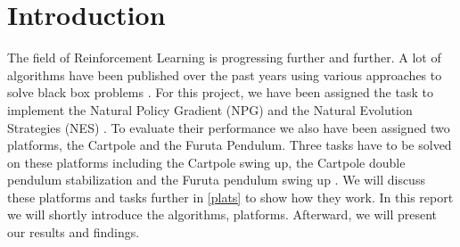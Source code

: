 \section{Introduction}
\label{intro}
The field of Reinforcement Learning is progressing further and further. A lot of algorithms have been published over the past years using various approaches to solve black box problems \cite{Wierstra14}. For this project, we have been assigned the task to implement the Natural Policy Gradient (NPG) \cite{Rajeswaran2017,Kakade2001} and the Natural Evolution Strategies (NES) \cite{Wierstra14}. To evaluate their performance we also have been assigned two platforms, the Cartpole and the Furuta Pendulum. Three tasks have to be solved on these platforms including the Cartpole swing up, the Cartpole double pendulum stabilization and the Furuta pendulum swing up \cite{Furuta1991}. We will discuss these platforms and tasks further in \autoref{plats} to show how they work. In this report we will shortly introduce the algorithms, platforms. Afterward, we will present our results and findings.

